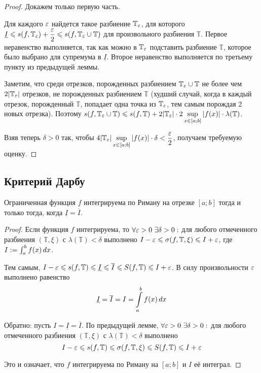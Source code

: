 \documentclass[a4paper]{article}
\theoremstyle{named}
\newcommand{\T}{\mathbb{T}}
\renewcommand{\int}{\intop}
\begin{document}
        \begin{proof}
            Докажем только первую часть. 

            Для каждого $\varepsilon$ найдется такое разбиение $\T_{\eps}$, для которого $\underline{I} \leq s(f, \T_{\eps}) + \dfrac{\eps}{2} \leq s(f, \T_{\eps} \cup \T)$ для произвольного разбиения $\T$. Первое неравенство выполняется, так как можно в $\T_{\eps}$ подставить разбиение $\T$, которое было выбрано для супремума в $\underline{I}$. Второе неравенство выполняется по третьему пункту из предыдущей леммы.

            Заметим, что среди отрезков, порожденных разбиением $\T_{\eps} \cup \T$ не более чем $2|\T_{\eps}|$ отрезков, не порожденных разбиением $\T$ (худший случай, когда в каждый отрезок, порожденный $\T$, попадает одна точка из $\T_{\eps}$, тем самым порождая 2 новых отрезка). Поэтому $s(f, \T_{\eps} \cup \T) \leq s(f, \T) + 2|\T_{\eps}| \cdot 2 \sup\limits_{x \in [a; b]} |f(x)| \cdot \lambda(\T)$.

            Взяв теперь $\delta > 0$ так, чтобы $4|\T_{\eps}| \sup\limits_{x \in [a; b]} |f(x)| \cdot \delta < \dfrac{\eps}{2}$, получаем требуемую оценку.
        \end{proof}

        \subsection{Критерий Дарбу}

        \begin{theorem*}
            Ограниченная функция $f$ интегрируема по Риману на отрезке $[a; b]$ тогда и только тогда, когда $\underline{I} = \overline{I}$.
        \end{theorem*}

        \begin{proof}
            Если функция $f$ интегрируема, то $\forall \eps > 0 \ \exists \delta > 0:$ для любого отмеченного разбиения $(\T, \xi)$ с $\lambda(\T) < \delta$ выполнено $I - \eps \leq \sigma(f, \T, \xi) \leq I + \eps$, где $I := \int_a^b f(x) \dd x$.

            Тем самым, $I - \eps \leq s(f, \T) \leq \underline{I} \leq \overline{I} \leq S(f, \T) \leq I + \eps$. В силу произвольности $\varepsilon$ выполнено равенство
            \begin{equation*}
                \underline{I} = \overline{I} = I = \int_a^b f(x) \dd x
            \end{equation*}

            Обратно: пусть $I = \underline{I} = \overline{I}$. По предыдущей лемме, $\forall \eps > 0 \ \exists \delta > 0:$ для любого отмеченного разбиения $(\T, \xi)$ с $\lambda(\T) < \delta$ выполнено
            \begin{equation*}
                I - \eps \leq s(f, \T) \leq \sigma(f, \T, \xi) \leq S(f, \T) \leq I + \eps
            \end{equation*}

            Это и означает, что $f$ интегрируема по Риману на $[a; b]$ и $I$ её интеграл.
        \end{proof}
\end{document}
